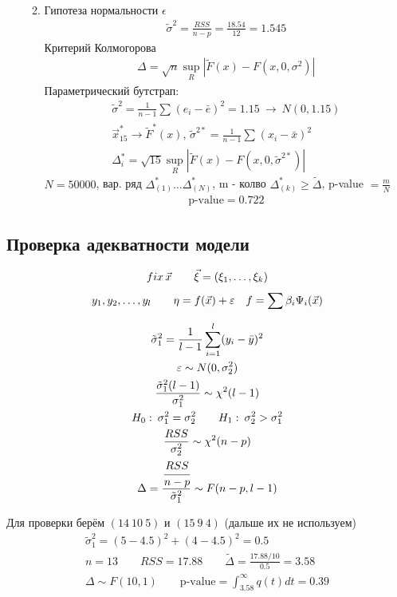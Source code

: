 \documentclass{article}
\begin{document}
\begin{eg}
\begin{enumerate}
\begin{enumerate}
\begin{gather*}
        \end{gather*}
      \item Гипотеза нормальности $\epsilon$
        \begin{gather*}
          \tilde{\sigma}^{2}=\frac{RSS}{n-p}=\frac{18.54}{12} = 1.545
        \end{gather*}
        Критерий Колмогорова
        \begin{gather*}
          \Delta = \sqrt{n}\sup_{R} | \tilde{F}(x) - F(x, 0, \sigma^{2})|
        \end{gather*}
        Параметрический бутстрап:
        \begin{gather*}
          \tilde{\sigma}^{2}=\frac{1}{n-1}\sum_{}^{}(e_i - \bar{e})^{2} = 1.15 \ \rightarrow \ N(0,1.15) \\ 
          \vec{x}_15^{*} \to \tilde{F}^{*}(x), \, \tilde{\sigma}^{2*}=\frac{1}{n-1}\sum_{}^{}(x_i-\bar{x})^{2} \\ 
          \Delta_i^{*} = \sqrt{15}\sup_{R}|\tilde{F}(x) - F(x, 0, \tilde{\sigma}^{2*})|
        \end{gather*}
        $N=50000$, вар. ряд $\Delta_{(1)}^{*}\dots \Delta_{(N)}^{*}$, m - колво $\Delta_{(k)}^{*} \ge \tilde{\Delta}$,
        p-value $=\frac{m}{N}$
        \begin{gather*}
          \text{p-value}=0.722
        \end{gather*}
    \end{enumerate}
\end{enumerate}
\end{eg}
\subsection{Проверка адекватности модели}
\begin{gather*}
  fix \, \vec{x} \qquad \vec{\xi}=(\xi_1,\dots ,\xi_k) \\ 
  y_1, y_2,\dots ,y_l \qquad \eta=f(\vec{x})+\epsilon \quad f=\sum_{}^{}\beta_i\Psi_i(\vec{x})\\ 
  \tilde{\sigma}^{2}_1=\frac{1}{l-1}\sum_{i=1}^{l}(y_i-\bar{y})^{2} \\ 
  \epsilon \sim N(0,\sigma^{2}_2) \\ 
  \frac{\tilde{\sigma}^{2}_1(l-1)}{\sigma_1^{2}} \sim \chi^{2}(l-1) \\ 
  H_0: \: \sigma_1^{2}=\sigma_2^{2} \qquad H_1: \: \sigma_2^{2} > \sigma_1^{2} \\ 
  \frac{RSS}{\sigma_2^{2}} \sim \chi^{2}(n-p) \\ 
  \Delta = \frac{\cfrac{RSS}{n-p}}{\tilde{\sigma}_1^{2}} \sim F(n-p, l-1)
\end{gather*}
\begin{eg}
  Для проверки берём $(14 \ 10 \ 5)$ и $(15 \ 9 \ 4)$ (дальше их не используем)
  \begin{gather*}
    \tilde{\sigma}_1^{2}=(5-4.5)^{2} + (4-4.5)^{2} = 0.5 \\ 
    n = 13 \qquad RSS=17.88 \qquad \tilde{\Delta}=\frac{17.88 / 10}{0.5}=3.58 \\ 
    \Delta \sim F(10, 1) \qquad \text{p-value}=\int_{3.58}^{\infty}q(t)dt = 0.39 
  \end{gather*}
\end{eg}
\end{document}
